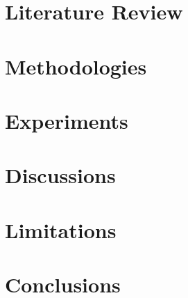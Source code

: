 \documentclass[a4paper]{ustthesis}
\begin{document}
% 

\chapter{Literature Review}
\label{ch_review}

\newpage

\chapter{Methodologies}
\label{ch_methodologies}

\newpage

\chapter{Experiments}
\label{ch_experiments}

\newpage

\chapter{Discussions}
\label{ch_discussions}

\newpage

\chapter{Limitations}
\label{ch_limitations}

\newpage

\chapter{Conclusions}
\label{ch_conclusions}

\newpage

%
%
%


\newpage
\end{document}
